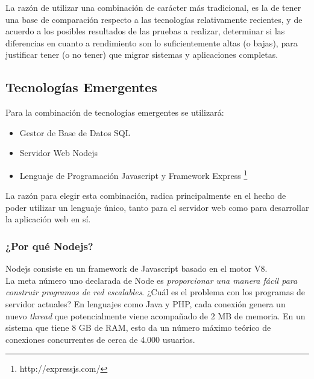 La razón de utilizar una combinación de carácter más tradicional, es la de tener una base 
de comparación respecto a las tecnologías relativamente recientes, y de acuerdo a los
posibles resultados de las pruebas a realizar, determinar si las diferencias en cuanto a 
rendimiento son lo suficientemente altas (o bajas), para justificar tener (o no tener) que 
migrar sistemas y aplicaciones completas.\\

\subsection{Tecnologías Emergentes}

Para la combinación de tecnologías emergentes se utilizará:

\begin{itemize}
 \item Gestor de Base de Datos SQL
 \item Servidor Web Nodejs
 \item Lenguaje de Programación Javascript y Framework Express \footnote{http://expressjs.com/}
\end{itemize}

La razón para elegir esta combinación, radica principalmente en el hecho de poder utilizar
un lenguaje único, tanto para el servidor web como para desarrollar la aplicación web en sí.\\





\subsubsection{¿Por qué Nodejs?}

Nodejs consiste en un framework de Javascript basado en el motor V8.\\

La meta número uno declarada de Node es \textit{proporcionar una manera fácil para construir 
programas de red escalables}. ¿Cuál es el problema con los programas de servidor actuales? 
En lenguajes como Java y PHP, cada conexión genera un nuevo \textit{thread} que potencialmente viene 
acompañado de 2 MB de memoria. En un sistema que tiene 8 GB de RAM, esto da un número máximo teórico 
de conexiones concurrentes de cerca de 4.000 usuarios.\\

